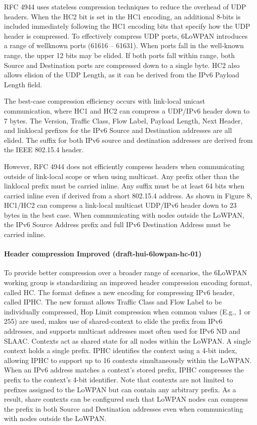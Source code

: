 RFC 4944 uses stateless compression techniques to reduce the overhead of UDP headers.
When the HC2 bit is set in the HC1 encoding,
	an additional 8-bits is included immediately following the HC1 encoding bits that specify how the UDP header is compressed.
To effectively compress UDP ports, 6LoWPAN introduces a range of wellknown ports (61616 – 61631).
When ports fall in the well-known range,
	the upper 12 bits may be elided.
If both ports fall within range,
	both Source and Destination ports are compressed down to a single byte.
HC2 also allows elision of the UDP Length,
	as it can be derived from the IPv6 Payload Length field.

The best-case compression efficiency occurs with link-local unicast communication,
	where HC1 and HC2 can compress a UDP/IPv6 header down to 7 bytes.
The Version,
	Traffic Class,
	Flow Label,
	Payload Length,
	Next Header,
	and linklocal prefixes for the IPv6 Source and Destination addresses are all elided.
The suffix for both IPv6 source and destination addresses are derived from the IEEE 802.15.4 header.

However,
	RFC 4944 does not efficiently compress headers when communicating outside of link-local scope or when using multicast.
Any prefix other than the linklocal prefix must be carried inline.
Any suffix must be at least 64 bits when carried inline even if derived from a short 802.15.4 address.
As shown in Figure 8,
	HC1/HC2 can compress a link-local multicast UDP/IPv6 header down to 23 bytes in the best case.
When communicating with nodes outside the LoWPAN,
	the IPv6 Source Address prefix and full IPv6 Destination Address must be carried inline.

\paragraph{Header compression Improved (draft-hui-6lowpan-hc-01)}
To provide better compression over a broader range of scenarios,
	the 6LoWPAN working group is standardizing an improved header compression encoding format,
	called HC.
The format defines a new encoding for compressing IPv6 header,
	called IPHC.
The new format allows Traffic Class and Flow Label to be individually compressed,
	Hop Limit compression when common values (E.g., 1 or 255) are used,
	makes use of shared-context to elide the prefix from IPv6 addresses,
	and supports multicast addresses most often used for IPv6 ND and SLAAC.
Contexts act as shared state for all nodes within the LoWPAN.
A single context holds a single prefix.
IPHC identifies the context using a 4-bit index,
	allowing IPHC to support up to 16 contexts simultaneously within the LoWPAN.
When an IPv6 address matches a context’s stored prefix,
	IPHC compresses the prefix to the context’s 4-bit identifier.
Note that contexts are not limited to prefixes assigned to the LoWPAN but can contain any arbitrary prefix.
As a result,
	share contexts can be configured such that LoWPAN nodes can compress the prefix in both Source and Destination addresses even when communicating with nodes outside the LoWPAN.


